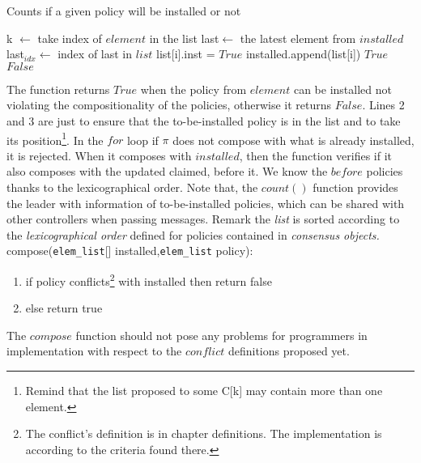 \documentclass{article}
\theoremstyle{remark}
\begin{document}
\begin{algorithm}
\caption{Counts if a given policy will be installed or not}
\begin{algorithmic}[1]
		\State k $\gets$ take index of $element$ in the list
	\EndIf
		\State last$\gets$ the latest element from $installed$
		\State last$_{idx}\gets$ index of last in $list$
				\State list[i].inst = $True$
				\State installed.append(list[i])
			\EndIf	
		\EndFor		
		 \Return $True$
		\EndIf
	\EndIf			
	\State\Return $False$
	\EndProcedure
\end{algorithmic}
\end{algorithm}
The function returns $True$ when the policy from $element$ can be installed not violating the compositionality of the policies, otherwise it returns $False$. Lines 2 and 3 are just to ensure that the to-be-installed policy is in the list and to take its position\footnote{Remind that the list proposed to some C[k] may contain more than one element.}. In the $for$ loop if $\pi$ does not compose with what is already installed, it is rejected. When it composes with $installed$, then the function verifies if it also composes with the updated claimed, before it. We know the $before$ policies thanks to the lexicographical order. Note that, the $count()$ function provides the leader with information of to-be-installed policies, which can be shared with other controllers when passing messages. 
Remark the \emph{list} is sorted according to the \emph{lexicographical order} defined for policies contained in \emph{consensus objects.} \\

compose(\texttt{elem\_list}[] installed,\texttt{elem\_list} policy):
\begin{enumerate}
\item if policy conflicts\footnote{The conflict's definition is in chapter definitions. The implementation is according to the criteria found there.} with installed then return false
\item else return true
\end{enumerate} 
The $compose$ function should not pose any problems for programmers in implementation with respect to the $conflict$ definitions proposed yet.
\end{document}
